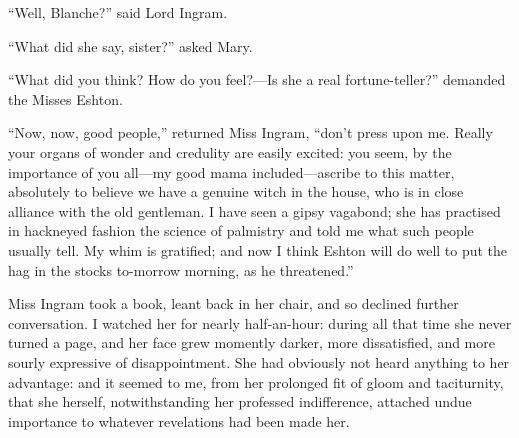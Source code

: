 \enquote{Well, Blanche?} said Lord Ingram.

\enquote{What did she say, sister?} asked Mary.

\enquote{What did you think? How do you feel?---Is she a real
fortune-teller?} demanded the Misses Eshton.

\enquote{Now, now, good people,} returned Miss Ingram, \enquote{don't
press upon me. Really your organs of wonder and credulity are easily
excited: you seem, by the importance of you all---my good mama
included---ascribe to this matter, absolutely to believe we have a
genuine witch in the house, who is in close alliance with the old
gentleman. I have seen a gipsy vagabond; she has practised in hackneyed
fashion the science of palmistry and told me what such people usually
tell. My whim is gratified; and now I think \Mr{} Eshton will do well to
put the hag in the stocks to-morrow morning, as he threatened.}

Miss Ingram took a book, leant back in her chair, and so declined
further conversation. I watched her for nearly half-an-hour: during all
that time she never turned a page, and her face grew momently darker,
more dissatisfied, and more sourly expressive of disappointment. She
had obviously not heard anything to her advantage: and it seemed to me,
from her prolonged fit of gloom and taciturnity, that she herself,
notwithstanding her professed indifference, attached undue importance to
whatever revelations had been made her.

